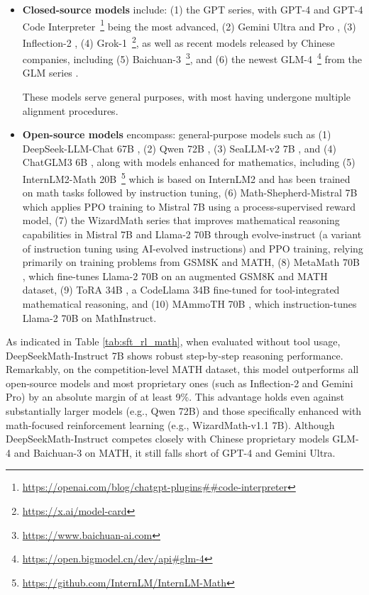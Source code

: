\begin{itemize}[topsep=0pt]
    \item \textbf{Closed-source models} include: (1) the GPT series, with GPT-4 \citep{gpt4} and GPT-4 Code Interpreter~\footnote{\url{https://openai.com/blog/chatgpt-plugins\#\#code-interpreter}} being the most advanced, (2) Gemini Ultra and Pro \citep{gemini}, (3) Inflection-2 \citep{inflection-2}, (4) Grok-1~\footnote{\url{https://x.ai/model-card}}, as well as recent models released by Chinese companies, including (5) Baichuan-3~\footnote{\url{https://www.baichuan-ai.com}}, and (6) the newest GLM-4~\footnote{\url{https://open.bigmodel.cn/dev/api\#glm-4}} from the GLM series \citep{glm}.

These models serve general purposes, with most having undergone multiple alignment procedures.
\item \textbf{Open-source models} encompass: general-purpose models such as (1) DeepSeek-LLM-Chat 67B \citep{deepseek-llm}, (2) Qwen 72B \citep{qwen}, (3) SeaLLM-v2 7B \citep{seallm}, and (4) ChatGLM3 6B \citep{chatglm3}, along with models enhanced for mathematics, including (5) InternLM2-Math 20B~\footnote{\url{https://github.com/InternLM/InternLM-Math}} which is based on InternLM2 and has been trained on math tasks followed by instruction tuning, (6) Math-Shepherd-Mistral 7B which applies PPO training \citep{schulman2017proximal} to Mistral 7B \citep{mistral} using a process-supervised reward model, (7) the WizardMath series \citep{wizardmath} that improves mathematical reasoning capabilities in Mistral 7B and Llama-2 70B \citep{llama2} through evolve-instruct (a variant of instruction tuning using AI-evolved instructions) and PPO training, relying primarily on training problems from GSM8K and MATH, (8) MetaMath 70B \citep{metamath}, which fine-tunes Llama-2 70B on an augmented GSM8K and MATH dataset, (9) ToRA 34B \cite{tora}, a CodeLlama 34B fine-tuned for tool-integrated mathematical reasoning, and (10) MAmmoTH 70B \citep{MathInstruct}, which instruction-tunes Llama-2 70B on MathInstruct.
\end{itemize}

As indicated in Table \ref{tab:sft_rl_math}, when evaluated without tool usage, DeepSeekMath-Instruct 7B shows robust step-by-step reasoning performance. Remarkably, on the competition-level MATH dataset, this model outperforms all open-source models and most proprietary ones (such as Inflection-2 and Gemini Pro) by an absolute margin of at least 9\%. This advantage holds even against substantially larger models (e.g., Qwen 72B) and those specifically enhanced with math-focused reinforcement learning (e.g., WizardMath-v1.1 7B). Although DeepSeekMath-Instruct competes closely with Chinese proprietary models GLM-4 and Baichuan-3 on MATH, it still falls short of GPT-4 and Gemini Ultra.

